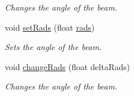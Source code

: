 \begin{DoxyCompactItemize}
\begin{DoxyCompactList}\small\item\em Changes the angle of the beam. \end{DoxyCompactList}\item 
void \hyperlink{classlighting_1_1DirectionalLightSource_a0d2f2c2dc0899e45540474391960ccd0}{set\+Rads} (float \hyperlink{classlighting_1_1DirectionalLightSource_af31141ab246928972aa52224e17ae46c}{rads})
\begin{DoxyCompactList}\small\item\em Sets the angle of the beam. \end{DoxyCompactList}\item 
void \hyperlink{classlighting_1_1DirectionalLightSource_a8737004541be45ccf76a77d52ea5ad0e}{change\+Rads} (float delta\+Rads)
\begin{DoxyCompactList}\small\item\em Changes the angle of the beam. \end{DoxyCompactList}\end{DoxyCompactItemize}
